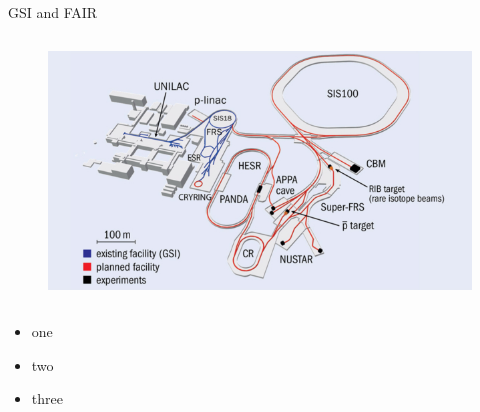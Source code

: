 \begin{columnframe}{GSI and FAIR}
    \begin{column}{0.5\textwidth}
        \begin{figure}
            \centering
            \includegraphics[width=\textwidth, frame]{images/fair_sis100_diagram.jpg}
        \end{figure}
    \end{column}
    \begin{column}{0.5\textwidth}
        \begin{itemize}
            \item one
            \item two
            \item three
        \end{itemize}
    \end{column}
\end{columnframe}

